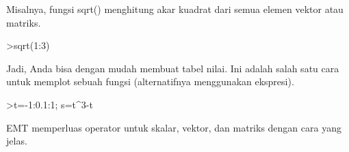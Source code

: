 \documentclass[a4paper,10pt]{article}
\begin{document}
\begin{eulernotebook}
\begin{eulercomment}
\begin{eulercomment}
\begin{eulercomment}
\begin{eulercomment}
\begin{eulercomment}
\begin{eulercomment}
\begin{eulercomment}
\begin{eulercomment}
\begin{eulercomment}
\begin{eulercomment}
\begin{eulercomment}
\begin{eulercomment}
\begin{eulercomment}
\begin{eulercomment}
\begin{eulercomment}
\begin{eulercomment}
\begin{eulercomment}
\begin{eulercomment}
\begin{eulercomment}
\begin{eulercomment}
\begin{eulercomment}
Misalnya, fungsi sqrt() menghitung akar kuadrat dari semua elemen
vektor atau matriks.
\end{eulercomment}
\begin{eulerprompt}
>sqrt(1:3)
\end{eulerprompt}
\begin{euleroutput}
  [1,  1.41421,  1.73205]
\end{euleroutput}
\begin{eulercomment}
Jadi, Anda bisa dengan mudah membuat tabel nilai. Ini adalah salah
satu cara untuk memplot sebuah fungsi (alternatifnya menggunakan
ekspresi).
\end{eulercomment}
\begin{eulerprompt}
>t=-1:0.1:1; s=t^3-t
\end{eulerprompt}
\begin{euleroutput}
  [0,  0.171,  0.288,  0.357,  0.384,  0.375,  0.336,  0.273,  0.192,
  0.099,  0,  -0.099,  -0.192,  -0.273,  -0.336,  -0.375,  -0.384,
  -0.357,  -0.288,  -0.171,  0]
\end{euleroutput}
\begin{eulercomment}
EMT memperluas operator untuk skalar, vektor, dan matriks dengan cara
yang jelas.


\end{eulercomment}
\end{eulercomment}
\end{eulercomment}
\end{eulercomment}
\end{eulercomment}
\end{eulercomment}
\end{eulercomment}
\end{eulercomment}
\end{eulercomment}
\end{eulercomment}
\end{eulercomment}
\end{eulercomment}
\end{eulercomment}
\end{eulercomment}
\end{eulercomment}
\end{eulercomment}
\end{eulercomment}
\end{eulercomment}
\end{eulercomment}
\end{eulercomment}
\end{eulercomment}
\end{eulernotebook}
\end{document}
